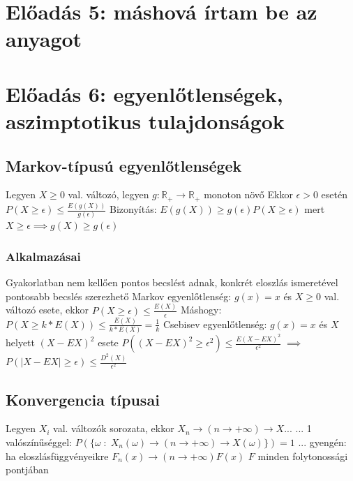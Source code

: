 \documentclass[12pt,a4paper]{article}
\begin{document}
\section{Előadás 5: máshová írtam be az anyagot}

\pagebreak

\section{Előadás 6: egyenlőtlenségek, aszimptotikus tulajdonságok}

\subsection{Markov-típusú egyenlőtlenségek}

\begin{outline}
	\1 Legyen $X \ge 0$ val. változó, legyen $g : \mathbb{R}_+ \to \mathbb{R}_+$ monoton növő
	\1 Ekkor $\epsilon > 0$ esetén $P(X \ge \epsilon) \le \frac{E(g(X))}{g(\epsilon)}$
	\1 Bizonyítás: $E(g(X)) \ge g(\epsilon)P(X \ge \epsilon)$ mert $X \ge \epsilon \implies g(X) \ge g(\epsilon)$
\end{outline}

\subsubsection{Alkalmazásai}

\begin{outline}
	\1 Gyakorlatban nem kellően pontos becslést adnak, konkrét eloszlás ismeretével pontosabb becslés szerezhető
	\1 Markov egyenlőtlenség:
		\2 $g(x)=x$ és $X \ge 0$ val. változó esete, ekkor $P(X \ge \epsilon) \le \frac{E(X)}{\epsilon}$
		\2 Máshogy: $P(X \ge k*E(X)) \le \frac{E(X)}{k*E(X)} = \frac{1}{k}$
	\1 Csebisev egyenlőtlenség:
		\2 $g(x)=x$ és $X$ helyett $(X-EX)^2$ esete
		\2 $P((X-EX)^2 \ge \epsilon^2) \le \frac{E(X-EX)^2}{\epsilon^2} \; \implies \;$
		$P(|X-EX| \ge \epsilon) \le \frac{D^2(X)}{\epsilon^2}$
\end{outline}

\subsection{Konvergencia típusai}

\begin{outline}
	\1 Legyen $X_i$ val. változók sorozata, ekkor $X_n \to (n \to +\infty) \to X$...
	\1 ... 1 valószínűséggel: $P(\{ \omega \;:\; X_n(\omega) \to (n \to +\infty) \to X(\omega) \}) = 1$
	\1 ... gyengén: ha eloszlásfüggvényeikre $F_n(x) \to (n \to +\infty) F(x)$
		\2 $F$ minden folytonossági pontjában
\end{outline}
\end{document}
